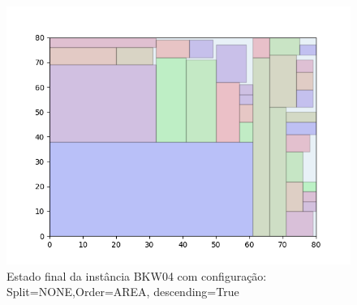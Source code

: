 \begin{figure}[H]
    \centering
    \caption[]{Estado final da instância BKW04 com configuração: Split=NONE,Order=AREA, descending=True}
    \label{fig:bkw04-none-area-true}
    \includegraphics[scale=0.5]{output/figures/bkw/bkw04/none/area/true/00}
\end{figure}